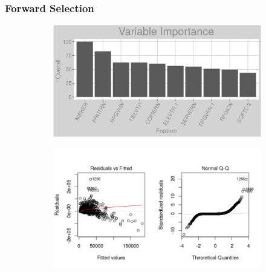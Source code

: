 \subsubsection{Forward Selection}
\label{appendix:electricity:lp}
\begin{figure}[h]
\centering
\begin{subfigure}{1\textwidth}
\centering
\includegraphics[width=.99\textwidth, height=0.3\textheight]{Images/electricity_lp_vars.png}
\end{subfigure}
\begin{subfigure}{1\textwidth}
\centering
\includegraphics[width=.99\textwidth, height=0.475\textheight]{Images/electricity_lp_res_1.png}
\end{subfigure}
\end{figure}
\FloatBarrier
\newpage
